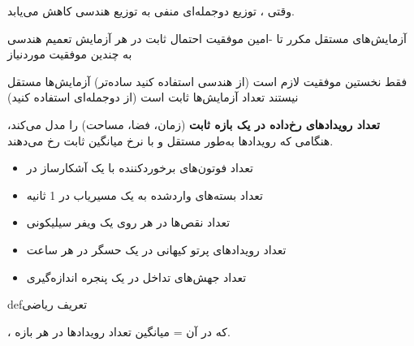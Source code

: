 




وقتی ، توزیع دوجمله‌ای منفی به توزیع هندسی کاهش می‌یابد.


\lr{\mbox{\PSyes{}}} آزمایش‌های مستقل مکرر تا -امین موفقیت\PSbr{}\lr{\mbox{\PSyes{}}} احتمال ثابت در هر آزمایش\PSbr{}\lr{\mbox{\PSyes{}}} تعمیم هندسی به چندین موفقیت موردنیاز


\lr{\mbox{\PSno{}}} فقط نخستین موفقیت لازم است (از هندسی استفاده کنید  ساده‌تر)\PSbr{}\lr{\mbox{\PSno{}}} آزمایش‌ها مستقل نیستند\PSbr{}\lr{\mbox{\PSno{}}} تعداد آزمایش‌ها ثابت است (از دوجمله‌ای استفاده کنید)



\textbf{تعداد رویدادهای رخ‌داده در یک بازه ثابت} (زمان، فضا، مساحت) را مدل می‌کند، هنگامی که رویدادها به‌طور مستقل و با نرخ میانگین ثابت رخ می‌دهند.


\begin{itemize}
\tightlist
\item
  تعداد فوتون‌های برخوردکننده با یک آشکارساز در 
\item
  تعداد بسته‌های واردشده به یک مسیریاب در 1 ثانیه
\item
  تعداد نقص‌ها در هر  روی یک ویفر سیلیکونی
\item
  تعداد رویدادهای پرتو کیهانی در یک حسگر در هر ساعت
\item
  تعداد جهش‌های تداخل در یک پنجره اندازه‌گیری
\end{itemize}

\begin{PSbox}[unbreakable]{def}{تعریف ریاضی}

، که در آن \lr{$\lambda$} = میانگین تعداد رویدادها در هر بازه.

\end{PSbox}



